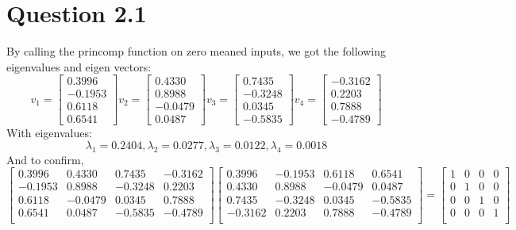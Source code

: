 \documentclass[epsfig]{article}
\begin{document}
\section*{Question 2.1}
By calling the princomp function on zero meaned inputs, we got the following eigenvalues and eigen vectors:
\[
v_1 = 
\begin{bmatrix}
    0.3996       \\
    -0.1953       \\
    0.6118       \\
    0.6541
\end{bmatrix}
v_2 = 
\begin{bmatrix}
    0.4330       \\
    0.8988       \\
    -0.0479      \\
    0.0487
\end{bmatrix}
v_3 = 
\begin{bmatrix}
     0.7435       \\
    -0.3248       \\
    0.0345       \\
    -0.5835
\end{bmatrix}
v_4 = 
\begin{bmatrix}
    -0.3162       \\
    0.2203       \\
    0.7888      \\
    -0.4789
\end{bmatrix}
\]
With eigenvalues:
$$\lambda_1  =0.2404, \lambda_2 = 0.0277, \lambda_3 = 0.0122, \lambda_4 = 0.0018 $$
And to confirm,
\[
\begin{bmatrix}
    0.3996  &  0.4330  &  0.7435 &  -0.3162 \\
   -0.1953  &  0.8988 &  -0.3248  &  0.2203 \\
    0.6118 &  -0.0479   & 0.0345   & 0.7888 \\
    0.6541  &  0.0487 &  -0.5835  & -0.4789 \\
\end{bmatrix}
\begin{bmatrix}
    0.3996 &  -0.1953 &   0.6118  &  0.6541\\
    0.4330   & 0.8988  & -0.0479   & 0.0487\\
    0.7435  & -0.3248  &  0.0345  & -0.5835\\
   -0.3162 &   0.2203 &   0.7888 &  -0.4789\\
\end{bmatrix}
 = 
 \begin{bmatrix}
    1 &  0 &   0  &  0\\
    0   &1  & 0   & 0\\
    0  & 0  &  1  & 0\\
   0 &   0 &   0 &  1\\
\end{bmatrix}
\]
\newpage
\end{document}
